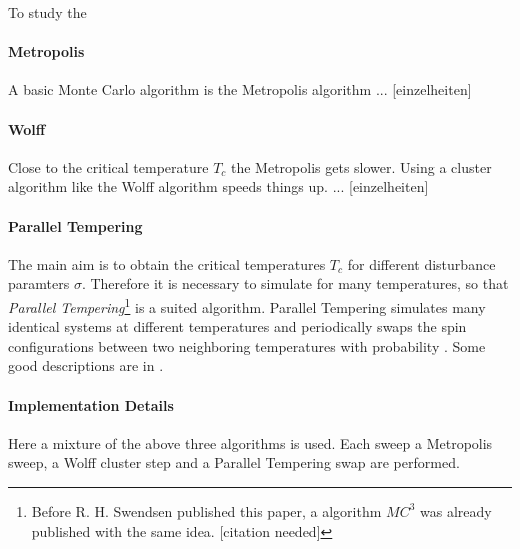 \label{sec:montecarlo}
To study the
\paragraph{Metropolis}
    A basic Monte Carlo algorithm is the Metropolis algorithm
    \cite{Metropolis1953} ... [einzelheiten]
\paragraph{Wolff}
    Close to the critical temperature \(T_c\) the Metropolis
    gets slower. Using a cluster algorithm like the Wolff
    algorithm \cite{Wolff1989} speeds things up.
    ... [einzelheiten]
\paragraph{Parallel Tempering}
    The main aim is to obtain the critical temperatures
    \(T_c\) for different disturbance paramters \(\sigma\).
    Therefore it is necessary to simulate for many temperatures,
    so that \emph{Parallel Tempering}\footnote{Before R. H.
        Swendsen published this paper, a algorithm \(MC^3\) was
        already published with the same idea. [citation needed]}
    \cite{ParallelTempering1986} is a suited algorithm. Parallel
    Tempering simulates many identical systems at different
    temperatures and periodically swaps the spin configurations
    between two neighboring temperatures with probability
    \(\). Some good descriptions are in
    \cite[S. ??]{NewmanBarkema1999} \cite[S. 155ff]{Katzgraber2011}.
\paragraph{Implementation Details}
    Here a mixture of the above three algorithms is used.
    Each sweep a Metropolis sweep, a Wolff cluster step and a
    Parallel Tempering swap are performed.

